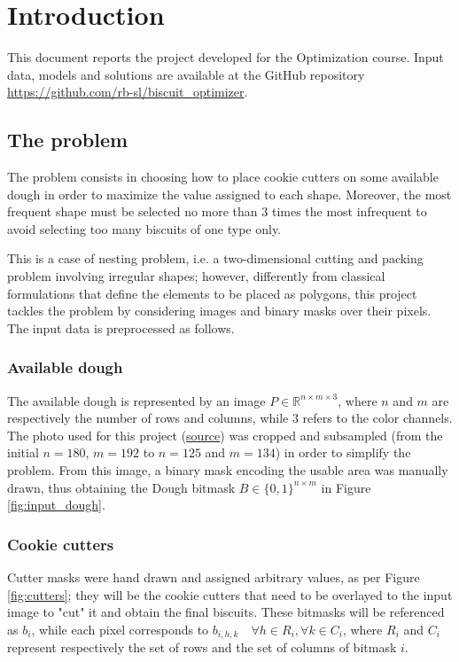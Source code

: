 
\section{Introduction}
This document reports the project developed for the Optimization course. Input data, models and solutions are available at the GitHub repository \href{https://github.com/rb-sl/biscuit_optimizer}{https://github.com/rb-sl/biscuit\_optimizer}.

\subsection{The problem}
The problem consists in choosing how to place cookie cutters on some available dough in order to maximize the value assigned to each shape. Moreover, the most frequent shape must be selected no more than 3 times the most infrequent to avoid selecting too many biscuits of one type only.

This is a case of nesting problem, i.e. a two-dimensional cutting and packing problem involving irregular shapes; however, differently from classical formulations that define the elements to be placed as polygons, this project tackles the problem by considering images and binary masks over their pixels. The input data is preprocessed as follows.

\subsubsection{Available dough}
The available dough is represented by an image $P \in \mathbb{R}^{n \times m \times 3}$, where $n$ and $m$ are respectively the number of rows and columns, while $3$ refers to the color channels. The photo used for this project (\href{https://www.buttalapasta.it/ricette/ricetta-biscotti-al-latte/25247/}{source}) was cropped and subsampled (from the initial $n=180$, $m=192$ to $n=125$ and $m=134$) in order to simplify the problem. From this image, a binary mask encoding the usable area was manually drawn, thus obtaining the Dough bitmask $B \in \{0, 1\}^{n \times m}$ in Figure \ref{fig:input_dough}.

\subsubsection{Cookie cutters}
Cutter masks were hand drawn and assigned arbitrary values, as per Figure \ref{fig:cutters}; they will be the cookie cutters that need to be overlayed to the input image to "cut" it and obtain the final biscuits. These bitmasks will be referenced as $b_i$, while each pixel corresponds to $b_{i, h, k} \quad \forall h \in R_i, \forall k \in C_i$, where $R_i$ and $C_i$ represent respectively the set of rows and the set of columns of bitmask $i$.

